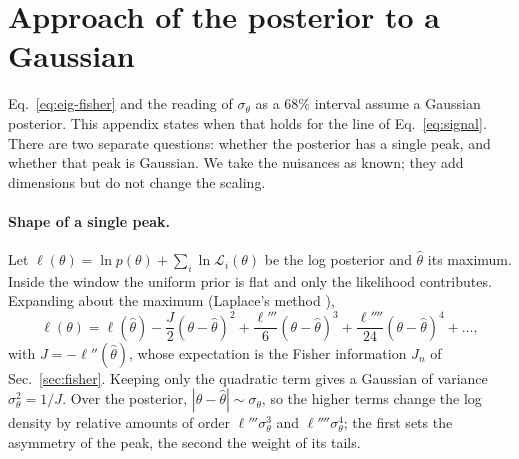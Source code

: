 \section{Approach of the posterior to a Gaussian}
\label{app:gaussian}

Eq.~\eqref{eq:eig-fisher} and the reading of $\sigma_\theta$ as a 68\% interval assume a Gaussian posterior. This
appendix states when that holds for the line of Eq.~\eqref{eq:signal}. There are two separate questions: whether
the posterior has a single peak, and whether that peak is Gaussian. We take the nuisances as known; they add
dimensions but do not change the scaling.

\paragraph{Shape of a single peak.} Let $\ell(\theta)=\ln p(\theta)+\sum_i\ln\mathcal L_i(\theta)$ be the log
posterior and $\hat\theta$ its maximum. Inside the window the uniform prior is flat and only the likelihood
contributes. Expanding about the maximum (Laplace's method \cite{vandervaart1998}),
\begin{equation}
  \ell(\theta)=\ell(\hat\theta)-\frac{J}{2}(\theta-\hat\theta)^2+\frac{\ell'''}{6}(\theta-\hat\theta)^3
  +\frac{\ell''''}{24}(\theta-\hat\theta)^4+\dots,
  \label{eq:laplace}
\end{equation}
with $J=-\ell''(\hat\theta)$, whose expectation is the Fisher information $J_n$ of Sec.~\ref{sec:fisher}. Keeping only
the quadratic term gives a Gaussian of variance $\sigma_\theta^2=1/J$. Over the posterior,
$|\theta-\hat\theta|\sim\sigma_\theta$, so the higher terms change the log density by relative amounts of order
$\ell'''\sigma_\theta^3$ and $\ell''''\sigma_\theta^4$; the first sets the asymmetry of the peak, the second the weight
of its tails.

